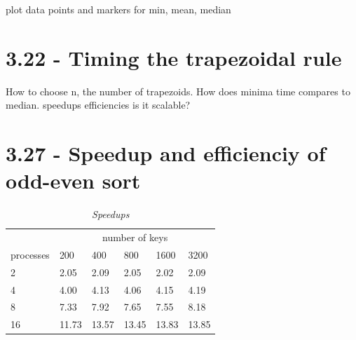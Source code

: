 \documentclass[a4paper,11pt,twoside]{article}
\begin{document}
plot data points and markers for min, mean, median

\section{3.22 - Timing the trapezoidal rule}
How to choose n, the number of trapezoids.
How does minima time compares to median.
speedups
efficiencies
is it scalable?

\section{3.27 - Speedup and efficienciy of odd-even sort}
\begin{table}[]
\centering
\caption{\textit{Speedups}}
\label{tab:speedups}
\begin{tabular}{llllll}
\multicolumn{1}{l|}{}          & \multicolumn{5}{c}{number of keys}                                                                                 \\ \cline{2-6} 
\multicolumn{1}{l|}{processes} & \multicolumn{1}{l|}{200} & \multicolumn{1}{l|}{400} & \multicolumn{1}{l|}{800} & \multicolumn{1}{l|}{1600} & 3200  \\ \hline
2                              & 2.05                     & 2.09                     & 2.05                     & 2.02                      & 2.09  \\
4                              & 4.00                     & 4.13                     & 4.06                     & 4.15                      & 4.19  \\
8                              & 7.33                     & 7.92                     & 7.65                     & 7.55                      & 8.18  \\
16                             & 11.73                    & 13.57                    & 13.45                    & 13.83                     & 13.85
\end{tabular}
\end{table}
\end{document}
